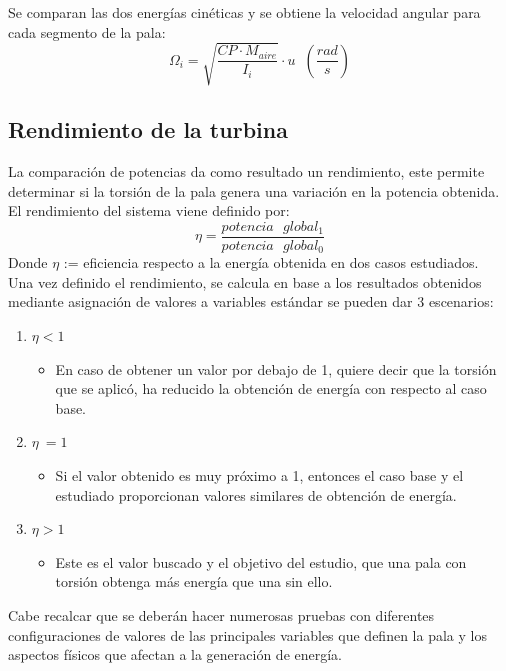 Se comparan las dos energías cinéticas y se obtiene la velocidad angular para cada segmento de la pala:
\begin{equation}
    \Omega_i = \sqrt{\dfrac{CP \cdot M_{aire}}{I_i}} \cdot u  \hspace{7pt} (\dfrac{rad}{s})
\end{equation}


 \subsection{Rendimiento de la turbina}
 \label{section:rendimiento}
 
La comparación de potencias da como resultado un rendimiento, este permite determinar si la torsión de la pala genera una variación en la potencia obtenida.\\

El rendimiento del sistema viene definido por:
\begin{equation}
  \eta = \dfrac{potencia \text{ } global_1}{potencia \text{ } global_0}  
 \label{def:rendimiento_potencias}
 \end{equation}
  Donde $\eta$ := eficiencia respecto a la energía obtenida en dos casos estudiados.\\
 
 Una vez definido el rendimiento, se calcula en base a los resultados obtenidos mediante asignación de valores a variables estándar se pueden dar 3 escenarios:
 

\begin{enumerate}
    \item $\eta < 1$
        \begin{itemize}
            \item En caso de obtener un valor por debajo de 1, quiere decir que la torsión que se aplicó, ha reducido la obtención de energía con respecto al caso base. 
        \end{itemize}
    \item $\eta ~= 1$
        \begin{itemize}
            \item Si el valor obtenido es muy próximo a 1, entonces el caso base y el estudiado proporcionan valores similares de obtención de energía.
        \end{itemize}
    \item $\eta > 1$
        \begin{itemize}
            \item Este es el valor buscado y el objetivo del estudio, que una pala con torsión obtenga más energía que una sin ello.
        \end{itemize}
\end{enumerate}

Cabe recalcar que se deberán hacer numerosas pruebas con diferentes configuraciones de valores de las principales variables que definen la pala y los aspectos físicos que afectan a la generación de energía.